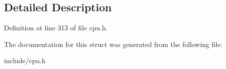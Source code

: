 \subsection{Detailed Description}


Definition at line 313 of file cpu.\-h.



The documentation for this struct was generated from the following file\-:\begin{DoxyCompactItemize}
\item 
include/cpu.\-h\end{DoxyCompactItemize}
